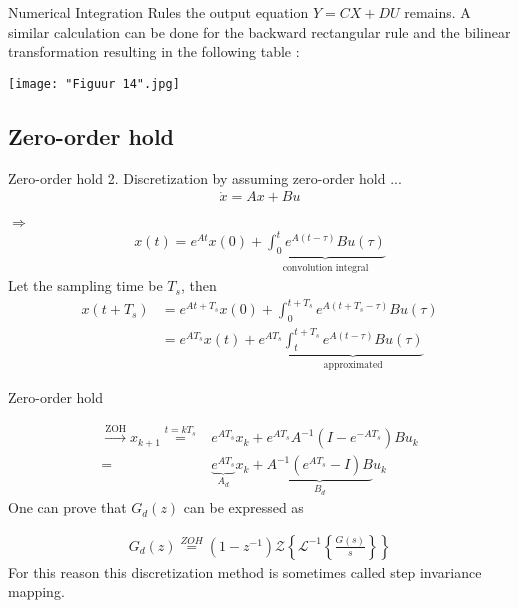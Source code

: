 \begin{frame}{Numerical Integration Rules}
the output equation $Y = CX + DU$ remains. A similar
calculation can be done for the backward rectangular rule
and the bilinear transformation resulting in the following
table :

\begin{center}
    \texttt{[image: "Figuur 14".jpg]}\\
\end{center}
\end{frame}

\subsection{Zero-order hold}
\begin{frame}{Zero-order hold}
2. Discretization by assuming zero-order hold ...
\vspace{-0.2cm}
\begin{align*}
\dot{x}=Ax+Bu
\end{align*}

$\Rightarrow$
\vspace{-0.4cm}
\begin{align*}
x(t)=e^{At}x(0)+
\underbrace{\int_0^t \! e^{A(t-\tau)}Bu(\tau)}_\text{convolution integral}
\end{align*}
Let the sampling time be $T_s$, then
\begin{align*}
x(t+T_s)&=e^{At+T_s}x(0)+
\int_0^{t+T_s} \! e^{A(t+T_s-\tau)}Bu(\tau)\\
&=e^{AT_s}x(t)+e^{AT_s}
\underbrace{\int_t^{t+T_s} \! e^{A(t-\tau)}Bu(\tau)}_\text{approximated}
\end{align*}
\end{frame}

\begin{frame}{Zero-order hold}





\begin{align*}
\xrightarrow{\text{ZOH}}x_{k+1}\stackrel{t=kT_s}{=} &e^{AT_s}x_k + e^{AT_s}A^{-1}(I-e^{-AT_s})Bu_k\\
= &\underbrace{e^{AT_s}}_{A_d}x_k + \underbrace{A^{-1}(e^{AT_s}-I)B}_{B_d}u_k
\end{align*}
One can prove that $G_d(z)$ can be expressed as\vspace{-0.3cm}


\begin{align*}
G_d(z)\stackrel{ZOH}{=} (1-z^{-1})\mathcal{Z}
\left\{ \mathcal{L}^{-1}
    \left\{ 
            \frac{G(s)}{s}
    \right\}
\right\}
\end{align*}
For this reason this discretization method is sometimes
called step invariance mapping.

\end{frame}

